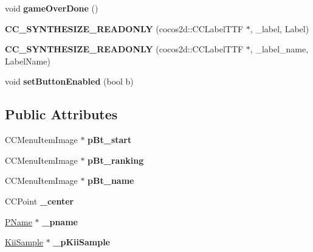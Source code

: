 \begin{DoxyCompactItemize}
\item 
\hypertarget{class_start_layer_acd423eb2cf9ec729bb4a66c35f03fbfd}{void {\bfseries game\-Over\-Done} ()}\label{class_start_layer_acd423eb2cf9ec729bb4a66c35f03fbfd}

\item 
\hypertarget{class_start_layer_a2f4881ff4f6d0f05c88ec7dfc115c1f9}{{\bfseries C\-C\-\_\-\-S\-Y\-N\-T\-H\-E\-S\-I\-Z\-E\-\_\-\-R\-E\-A\-D\-O\-N\-L\-Y} (cocos2d\-::\-C\-C\-Label\-T\-T\-F $\ast$, \-\_\-label, Label)}\label{class_start_layer_a2f4881ff4f6d0f05c88ec7dfc115c1f9}

\item 
\hypertarget{class_start_layer_a20d57ef427a64cac27bf0cbb65598a66}{{\bfseries C\-C\-\_\-\-S\-Y\-N\-T\-H\-E\-S\-I\-Z\-E\-\_\-\-R\-E\-A\-D\-O\-N\-L\-Y} (cocos2d\-::\-C\-C\-Label\-T\-T\-F $\ast$, \-\_\-label\-\_\-name, Label\-Name)}\label{class_start_layer_a20d57ef427a64cac27bf0cbb65598a66}

\item 
\hypertarget{class_start_layer_ac571ba29e17766c43884a6c32c93f315}{void {\bfseries set\-Button\-Enabled} (bool b)}\label{class_start_layer_ac571ba29e17766c43884a6c32c93f315}

\end{DoxyCompactItemize}
\subsection*{Public Attributes}
\begin{DoxyCompactItemize}
\item 
\hypertarget{class_start_layer_a09abd49db897c094614ef39e61683408}{C\-C\-Menu\-Item\-Image $\ast$ {\bfseries p\-Bt\-\_\-start}}\label{class_start_layer_a09abd49db897c094614ef39e61683408}

\item 
\hypertarget{class_start_layer_a0a04774347936f5fd119531b076c7eac}{C\-C\-Menu\-Item\-Image $\ast$ {\bfseries p\-Bt\-\_\-ranking}}\label{class_start_layer_a0a04774347936f5fd119531b076c7eac}

\item 
\hypertarget{class_start_layer_aa5cbf76f6e52e8603df43379e9dc4f0e}{C\-C\-Menu\-Item\-Image $\ast$ {\bfseries p\-Bt\-\_\-name}}\label{class_start_layer_aa5cbf76f6e52e8603df43379e9dc4f0e}

\item 
\hypertarget{class_start_layer_aaa538db1811a7ecd82a2dfd208900e40}{C\-C\-Point {\bfseries \-\_\-center}}\label{class_start_layer_aaa538db1811a7ecd82a2dfd208900e40}

\item 
\hypertarget{class_start_layer_adb4078867969ba0d02d6d6c631d3eee7}{\hyperlink{class_p_name}{P\-Name} $\ast$ {\bfseries \-\_\-pname}}\label{class_start_layer_adb4078867969ba0d02d6d6c631d3eee7}

\item 
\hypertarget{class_start_layer_a34189ce55f8dcb56b19840c16b252150}{\hyperlink{class_kii_sample}{Kii\-Sample} $\ast$ {\bfseries \-\_\-p\-Kii\-Sample}}\label{class_start_layer_a34189ce55f8dcb56b19840c16b252150}

\end{DoxyCompactItemize}


